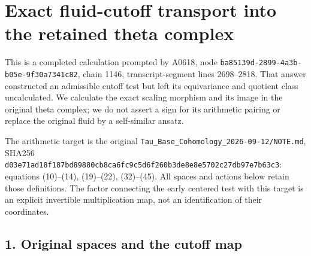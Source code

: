 \section{Exact fluid-cutoff transport into the retained theta
complex}\label{TranscriptStage:proof09:exact-fluid-cutoff-transport-into-the-retained-theta-complex}

This is a completed calculation prompted by A0618, node
\texttt{ba85139d-\allowbreak{}2899-\allowbreak{}4a3b-\allowbreak{}b05e-\allowbreak{}9f30a7341c82}, chain 1146,
transcript-segment lines 2698--2818. That answer constructed an
admissible cutoff test but left its equivariance and quotient class
uncalculated. We calculate the exact scaling morphism and its image in
the original theta complex; we do not assert a sign for its arithmetic
pairing or replace the original fluid by a self-similar ansatz.

The arithmetic target is the original
\texttt{Tau\_\allowbreak{}Base\_\allowbreak{}Cohomology\_\allowbreak{}2026-\allowbreak{}09-\allowbreak{}12/\allowbreak{}NOTE.md}, SHA256
\texttt{d03e71ad\allowbreak{}18f187bd\allowbreak{}89880cb8\allowbreak{}ca6fc9c5\allowbreak{}d6f260b3\allowbreak{}de8e8e57\allowbreak{}02c27db9\allowbreak{}7e7b63c3}:
equations (10)--(14), (19)--(22), (32)--(45). All spaces and actions
below retain those definitions. The factor connecting the early centered
test with this target is an explicit invertible multiplication map, not
an identification of their coordinates.

\subsection{1. Original spaces and the cutoff
map}\label{TranscriptStage:proof09:original-spaces-and-the-cutoff-map}

